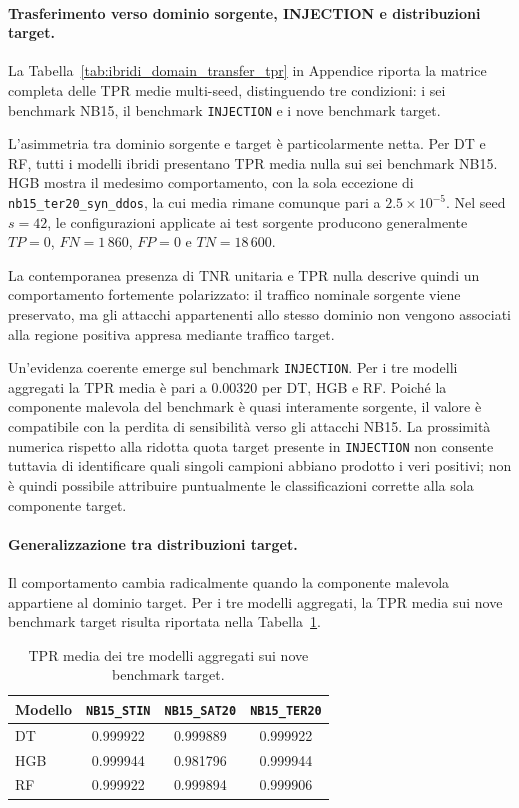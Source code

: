\paragraph{Trasferimento verso dominio sorgente, INJECTION e distribuzioni target.}
La Tabella~\ref{tab:ibridi_domain_transfer_tpr} in Appendice riporta la matrice completa delle TPR medie multi-seed, distinguendo tre condizioni: i sei benchmark NB15, il benchmark \texttt{INJECTION} e i nove benchmark target.

L'asimmetria tra dominio sorgente e target è particolarmente netta. 
Per DT e RF, tutti i modelli ibridi presentano TPR media nulla sui sei benchmark NB15. 
HGB mostra il medesimo comportamento, con la sola eccezione di \texttt{nb15\_ter20\_syn\_ddos}, la cui media rimane comunque pari a $2.5\times10^{-5}$. 
Nel seed $s=42$, le configurazioni applicate ai test sorgente producono generalmente $TP=0$, $FN=1\,860$, $FP=0$ e $TN=18\,600$.

La contemporanea presenza di TNR unitaria e TPR nulla descrive quindi un comportamento fortemente polarizzato: il traffico nominale sorgente viene preservato, ma gli attacchi appartenenti allo stesso dominio non vengono associati alla regione positiva appresa mediante traffico target.

Un'evidenza coerente emerge sul benchmark \texttt{INJECTION}. 
Per i tre modelli aggregati la TPR media è pari a $0.00320$ per DT, HGB e RF. 
Poiché la componente malevola del benchmark è quasi interamente sorgente, il valore è compatibile con la perdita di sensibilità verso gli attacchi NB15. 
La prossimità numerica rispetto alla ridotta quota target presente in \texttt{INJECTION} non consente tuttavia di identificare quali singoli campioni abbiano prodotto i veri positivi; non è quindi possibile attribuire puntualmente le classificazioni corrette alla sola componente target.

\paragraph{Generalizzazione tra distribuzioni target.}
Il comportamento cambia radicalmente quando la componente malevola appartiene al dominio target. 
Per i tre modelli aggregati, la TPR media sui nove benchmark target risulta riportata nella Tabella~\ref{tab:tpr_media_target_aggregati}.

\begin{table}[H]
    \centering
    \small
    \caption{TPR media dei tre modelli aggregati sui nove benchmark target.}
    \label{tab:tpr_media_target_aggregati}
    \begin{tabular}{lccc}
        \toprule
        \textbf{Modello} & \textbf{\texttt{NB15\_STIN}} & \textbf{\texttt{NB15\_SAT20}} & \textbf{\texttt{NB15\_TER20}} \\
        \midrule
        DT  & 0.999922 & 0.999889 & 0.999922 \\
        HGB & 0.999944 & 0.981796 & 0.999944 \\
        RF  & 0.999922 & 0.999894 & 0.999906 \\
        \bottomrule
    \end{tabular}
\end{table}

